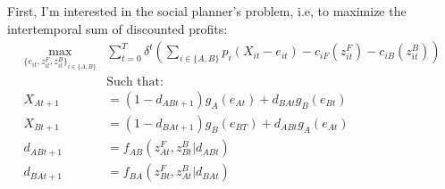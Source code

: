 \documentclass{article}
\begin{document}
First, I'm interested in the social planner's problem, i.e, to maximize the intertemporal sum of discounted profits:
\begin{align*}
    \max_{\{e_{it}, z_{it}^F, z_{it}^B \}_{i \in \{A,B\}}} & \sum_{t=0}^T \delta^t \left( \sum_{i \in \{A,B\}} p_i(X_{it} - e_{it}) - c_{iF}(z_{it}^F) - c_{iB}(z_{it}^B) \right)\\
     &\text{Such that:}\\
        X_{At+1} &= (1-d_{ABt+1})g_A(e_{At})+d_{BAt}g_B(e_{Bt})
    \\
    X_{Bt+1} &= (1 - d_{BAt+1})g_B(e_{BT}) + d_{ABt}g_A(e_{At})\\
     d_{ABt+1} &= f_{AB}(z^F_{At}, z^B_{Bt}| d_{ABt}) \\
    d_{BAt+1} &= f_{BA}(z^F_{Bt}, z^B_{At}| d_{BAt}) 
\end{align*}
\end{document}
